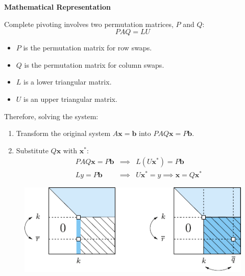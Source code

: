 \highspace
\begin{flushleft}
    \textcolor{Green3}{ \textbf{Mathematical Representation}}
\end{flushleft}
Complete pivoting involves two permutation matrices, $P$ and $Q$:
\begin{equation*}
    PAQ = LU
\end{equation*}
\begin{itemize}
    \item $P$ is the permutation matrix for row swaps.
    \item $Q$ is the permutation matrix for column swaps.
    \item $L$ is a lower triangular matrix.
    \item $U$ is an upper triangular matrix.
\end{itemize}
Therefore, solving the system:
\begin{enumerate}
    \item Transform the original system $A\mathbf{x} = \mathbf{b}$ into $PAQ\mathbf{x} = P\mathbf{b}$.
    \item Substitute $Q\mathbf{x}$ with $\mathbf{x}^{*}$:
    \begin{equation*}
        \begin{array}{rcl}
            PAQ\mathbf{x} = P\mathbf{b} &\implies& L\left(U\mathbf{x}^{*}\right) = P\mathbf{b} \\ [.5em]
            Ly = P\mathbf{b} &\implies& U\mathbf{x}^* = y \implies \mathbf{x} = Q\mathbf{x}^*
        \end{array}
    \end{equation*}
\end{enumerate}
\begin{figure}[!htp]
    \centering
    \includegraphics[width=.5\textwidth]{img/pivoting-by-rows-2.pdf}
\end{figure}